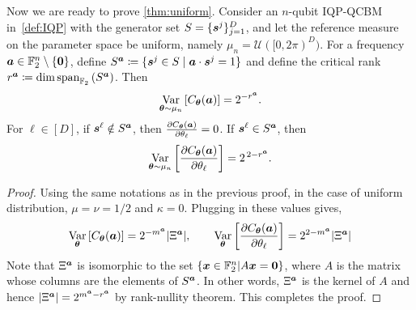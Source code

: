 \documentclass{article}
\theoremstyle{plain}
\theoremstyle{definition}
\theoremstyle{remark}
\begin{document}
Now we are ready to prove \cref{thm:uniform}. Consider an $n$-qubit IQP-QCBM in~\cref{def:IQP} with the generator set $S=\{{\bm{s}^j}\}_{j=1}^D$, and let the reference measure on the parameter space be uniform, namely $\mu_n = \mathcal{U}([0,2\pi)^D)$. For a frequency ${\bm{a}} \in \mathbb{F}_2^n \setminus \{\mathbf{0}\}$, define $S^{{\bm{a}}} \coloneqq \{ {\bm{s}^j}\in S \mid {\bm{a}} \cdot {\bm{s}^j} = 1 \}$ and define the critical rank $r^{\bm{a}} \coloneqq \dim \operatorname{span}_{\mathbb{F}_2}\left( S^{{\bm{a}}} \right)$. Then
\begin{equation*}
\operatorname*{Var}_{{\bm{\theta}}\sim\mu_n} \left[ C_{\bm{\theta}}({\bm{a}})\right] = 2^{-r^{\bm{a}}}. 
\end{equation*} For $\ell \in [D]$, if ${\bm{s}^\ell} \notin S^{\bm{a}}$, then $ \frac{\partial C_{\bm{\theta}}({\bm{a}})}{\partial \theta_\ell}=0$. If ${\bm{s}^\ell} \in S^{\bm{a}}$, then
\begin{equation*}
\operatorname*{Var}_{{\bm{\theta}}\sim\mu_n} \left[ \frac{\partial C_{\bm{\theta}}({\bm{a}})}{\partial \theta_\ell} \right] = 2^{\,2-r^{\bm{a}}}. \end{equation*}
\begin{proof}
Using the same notations as in the previous proof, in the case of uniform distribution, $\mu = \nu = 1/2$ and $\kappa = 0$. Plugging in these values gives, \begin{equation*}
    \operatorname*{Var}_{\bm{\theta}} \left[ C_{\bm{\theta}}({\bm{a}}) \right] = 2^{-m^{\bm{a}}} \abs{\Xi^{\bm{a}}} , \qquad \operatorname*{Var}_{{\bm{\theta}}}\left[\frac{\partial C_{\bm{\theta}}({\bm{a}})}{\partial\theta_\ell}\right]
= 2^{2-m^{\bm{a}}} \abs{\Xi^{\bm{a}}} 
\end{equation*}
Note that $\Xi^{\bm{a}}$ is isomorphic to the set $\{{\bm{x}} \in \mathbb{F}_2^n | A {\bm{x}} = \bm{0}\}$, where $A$ is the matrix whose columns are the elements of $S^{\bm{a}}$. In other words, $\Xi^{\bm{a}}$ is the kernel of $A$ and hence $\abs{\Xi^{\bm{a}}} = 2^{m^{\bm{a}}-r^{\bm{a}}}$ by rank-nullity theorem. This completes the proof.
\end{proof}
 
\end{document}
